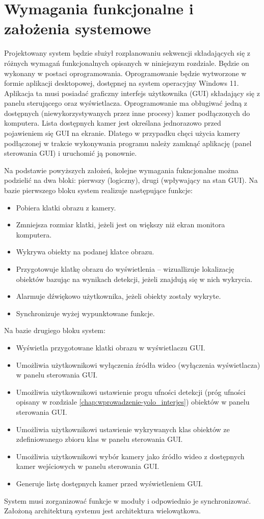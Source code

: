\section{Wymagania funkcjonalne i założenia systemowe}
\label{chap:wymagania-funcjonalne}
Projektowany system będzie służył rozplanowaniu sekwencji składających się z różnych wymagań funkcjonalnych opisanych w niniejszym rozdziale. Będzie on wykonany w postaci oprogramowania. 
Oprogramowanie będzie wytworzone w formie aplikacji desktopowej, dostępnej na system operacyjny Windows 11. Aplikacja ta musi posiadać graficzny interfejs użytkownika (GUI) składający się z panelu sterującego oraz wyświetlacza. 
Oprogramowanie ma obługiwać jedną z dostępnych (niewykorzystywanych przez inne procesy) kamer podłączonych do komputera. Lista dostępnych kamer jest określana jednorazowo przed pojawieniem się GUI na ekranie. Dlatego w przypadku chęci użycia kamery podłączonej w trakcie wykonywania programu należy zamknąć aplikację (panel sterowania GUI) i uruchomić ją ponownie.

Na podstawie powyższych założeń, kolejne wymagania fukncjonalne można podzielić na dwa bloki: pierwszy (logiczny), drugi (wpływający na stan GUI). Na bazie pierwszego bloku system realizuje następujące funkcje:
\begin{itemize}
    \item Pobiera klatki obrazu z kamery.
    \item Zmniejsza rozmiar klatki, jeżeli jest on większy niż ekran monitora komputera.
    \item Wykrywa obiekty na podanej klatce obrazu.
    \item Przygotowuje klatkę obrazu do wyświetlenia -- wizuallizuje lokalizację obiektów bazując na wynikach detekcji, jeżeli znajdują się w nich wykrycia.
    \item Alarmuje dźwiękowo użytkownika, jeżeli obiekty zostały wykryte.
    \item Synchronizuje wyżej wypunktowane funkcje.
\end{itemize}

Na bazie drugiego bloku system:
\begin{itemize}
        \item Wyświetla przygotowane klatki obrazu w wyświetlaczu GUI.
        \item Umożliwia użytkownikowi wyłączenia źródła wideo (wyłączenia wyświetlacza) w panelu sterowania GUI.
        \item Umożliwia użytkownikowi ustawienie progu ufności detekcji (próg ufności opisany w rozdziale \ref{chap:wprowadzenie-yolo_interjes}) obiektów w panelu sterowania GUI.
        \item Umożliwia użytkownikowi ustawienie wykrywanych klas obiektów ze zdefiniowanego zbioru klas w panelu sterowania GUI.
        \item Umożliwia użytkownikowi wybór kamery jako źródło wideo z dostępnych kamer wejściowych w panelu sterowania GUI.
        \item Generuje listę dostępnych kamer przed wyświetleniem GUI.
\end{itemize}

System musi zorganizować funkcje w moduły i odpowiednio je synchronizować. Założoną architekturą systemu jest architektura wielowątkowa. 